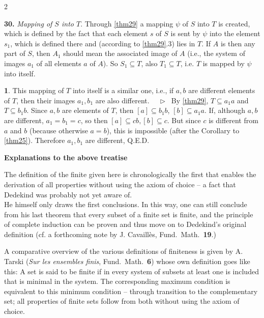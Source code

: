 \documentclass[leqno,hidelinks,10pt]{article}
\theoremstyle{definition}
\newtheorem{satz}{\protect\satzname}
\newcommand{\satzname}{}
\renewcommand{\satzname}{\hspace{-4pt}.\ Satz}%
\renewcommand{\satzname}{\hspace{-4pt}.\ Theorem}%
\newcommand\Beweis{\medskip \newline $ \phantom{'.'} \rhd \ $}%
\newcommand{\QED}{Q.E.D.}
\newcommand{\partof}{\subseteq}
\newcommand{\sref}[1]{\underline{\ref{#1}}}%
\begin{document}
\begin{paracol}{2}
\begin{rightcolumn}
\noindent \textbf{30.}\label{thm30} \hspace{-9pt} \emph{Mapping of $S$ into $T$}.
Through \sref{thm29} a mapping $\psi$ of $S$ into $T$ is
created, which is defined by the fact that each element $s$ of $S$ is sent by
$\psi$ into the element $s_1$, which is defined there and (according to \sref{thm29}.3)
lies in $T$. If $A$ is then any part of $S$, then $A_1$ should mean the associated
image of $A$ (i.e., the system of images $a_1$ of all elements $a$ of $A$). So
$S_1 \partof T$, also $T_1 \partof T$, i.e. $T$ is mapped by $\psi$ into itself.

\begin{satz}\label{thm31}
This mapping of $T$ into itself is a similar one, i.e., if $a, b$ are different
elements of $T$, then their images $a_1, b_1$ are also different.%
\Beweis
By \sref{thm29}, $T \partof a_1a$ and $T \partof b_1b$. Since $a, b$ are elements
of $T$, then $[a] \partof b_1b$, $[b] \partof a_1a$. If, although $a, b$ are
different, $a_1 = b_1  = c$, so then $[a] \partof cb, [b] \partof c$. But since
$c$ is different from $a$ and $b$ (because otherwise $a = b$), this is impossible
(after the Corollary to \sref{thm25}). Therefore $a_1, b_1$ are different, \QED
\end{satz}

\newpage

\hspace{84pt}

\begin{center}{\Large\textbf{Explanations to the above treatise \ \\ }}
\end{center}

\vspace{30pt}

\fontsize{9}{9}\selectfont
\justifying
The definition of the finite given here is chronologically the first that enables
the derivation of all properties without using the axiom of choice -- a fact that
Dedekind was probably not yet aware of. \\

He himself only draws the first conclusions. In this way, one can still conclude
from his last theorem that every subset of a finite set is finite, and the principle
of complete induction can be proven and thus move on to Dedekind's original
definition (cf. a forthcoming note by J. Cavaillès, Fund.\ Math.\ \textbf{19}.)
\ \\
\smallskip

A comparative overview of the various definitions of finiteness is given by A.
Tarski (\emph{Sur les ensembles finis}, Fund.\ Math.\ \textbf{6}) whose own
definition goes like this: A set is said to be finite if in every system of
subsets at least one is included that is minimal in the system. The corresponding
maximum condition is equivalent to this minimum condition -- through transition to the
complementary set; all properties of finite sets follow from both without using
the axiom of choice.
\ \\



\end{rightcolumn}
\end{paracol}
\end{document}
